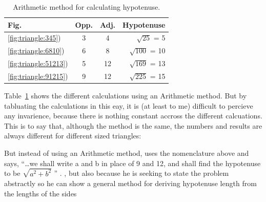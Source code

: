 \documentclass[a4paper, 12pt]{article}
\begin{document}
\begin{table}[h!]
    \small 
    \centering
    \begin{tabular}{lccr} 
        Fig. & Opp. & Adj. & Hypotenuse \\
        \hline
        \ref{fig:triangle:345}) & 3 & 4 & \(\sqrt{25}\) = 5 \\	
        \ref{fig:triangle:6810}) & 6 & 8 & \(\sqrt{100}\) = 10  \\	
        \ref{fig:triangle:51213}) & 5 & 12 & \(\sqrt{169}\) = 13 \\	
        \ref{fig:triangle:91215}) & 9 & 12 & \(\sqrt{225}\) = 15  \\	    
    \end{tabular}
    \caption{Arithmetic method for calculating hypotenuse.}
    \label{tab:arithmetic}
\end{table}

Table~\ref{tab:arithmetic} shows the different calculations using an Arithmetic method. But by tabluating the calculations in this eay, it is (at least to me) difficult to percieve any invarience, because there is nothing constant accross the different calcuations. This is to say that, although the method is the same, the numbers and results are always different for different sized triangles: 




But instead of using an Arithmetic method, \citeauthor{descartes_philosophical_1911} uses the nomenclature above and says, ``\dots we shall write a and b in place of 9 and 12, and shall find the hypotenuse to be \(\sqrt{a^2 + b^2}\)  '' \citeyearpar[Rule~XVI, pp.~67-68]{descartes_philosophical_1911}. 
, but also because he is seeking to state the problem abstractly so he can show a general method for deriving hypotenuse length from the lengths of the sides \citeyearpar[Rule~XVI, pp.~69-70]{descartes_philosophical_1911}
\end{document}
